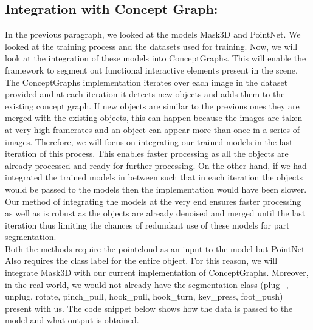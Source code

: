\subsection{Integration with Concept Graph:}
In the previous paragraph,  we looked at the models Mask3D and PointNet. We looked at the training process and the datasets used for training. Now, we will 
look at the integration of these models into ConceptGraphs. This will enable the framework to segment out functional interactive elements present in
the scene. \\
The ConceptGraphs implementation iterates over each image in the dataset provided and at each iteration it detects new objects and adds them to 
the existing concept graph. If new objects are similar to the previous ones they are merged with the existing objects, this can happen because
the images are taken at very high framerates and an object can appear more than once in a series of images. 
Therefore, we will focus on integrating our trained models in the last iteration of this process. This enables faster processing as
all the objects are already processed and ready for further processing. On the other hand, if we had integrated the trained models in between
such that in each iteration the objects would be passed to the models then the implementation would have been slower. Our method of integrating the 
models at the very end ensures faster processing as well as is robust as the objects are already denoised and merged until the last iteration thus
limiting the chances of redundant use of these models for part segmentation. \\
Both the methods require the pointcloud as an input to the model but PointNet Also requires the class label for the entire object. For this reason,
we will integrate Mask3D with our current implementation of ConceptGraphs. Moreover, in the real world, we would not already have the segmentation class (plug\_,
unplug, rotate, pinch\_pull, hook\_pull, hook\_turn, key\_press, foot\_push) present with us. The code snippet below shows how the data is passed to
the model and what output is obtained.

